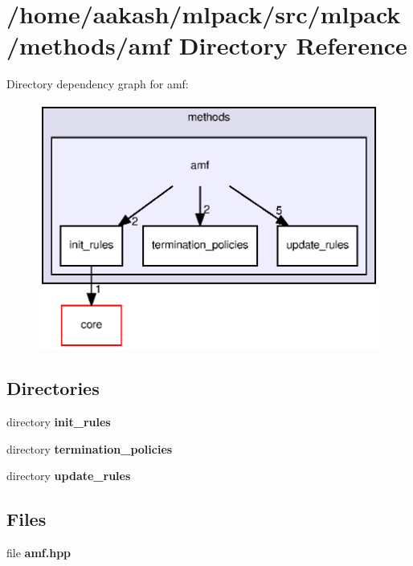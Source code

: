 \section{/home/aakash/mlpack/src/mlpack/methods/amf Directory Reference}
\label{dir_5d79f627790f2a48f4f1d0c9d0b8c107}
Directory dependency graph for amf\+:
\nopagebreak
\begin{figure}[H]
\begin{center}
\leavevmode
\includegraphics[width=350pt]{dir_5d79f627790f2a48f4f1d0c9d0b8c107_dep}
\end{center}
\end{figure}
\subsection*{Directories}
\begin{DoxyCompactItemize}
\item 
directory \textbf{ init\+\_\+rules}
\item 
directory \textbf{ termination\+\_\+policies}
\item 
directory \textbf{ update\+\_\+rules}
\end{DoxyCompactItemize}
\subsection*{Files}
\begin{DoxyCompactItemize}
\item 
file \textbf{ amf.\+hpp}
\end{DoxyCompactItemize}
